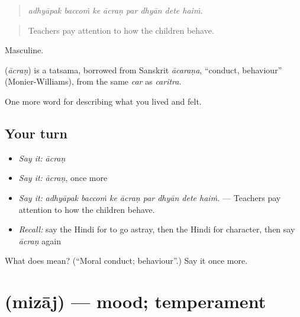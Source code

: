 \begin{quote}
       
\end{quote}

\begin{quote}
\emph{adhyāpak baccoṁ ke ācraṇ par dhyān dete haiṁ.}
\end{quote}

\begin{quote}
Teachers pay attention to how the children behave.
\end{quote}

Masculine.

\begin{cousinweb}
\textbf{} (\emph{ācraṇ}) is a tatsama, borrowed from Sanskrit \emph{ācaraṇa}, \textquotedblleft{}conduct, behaviour\textquotedblright{} (Monier-Williams), from the same \emph{car} as \emph{caritra}.
\end{cousinweb}

\begin{grammarlens}[title={What you've built}]
One more word for describing what you lived and felt.
\end{grammarlens}

\subsection*{Your turn}
\begin{itemize}
\raggedright
  \item \emph{Say it:} \emph{ācraṇ}
  \item \emph{Say it:} \emph{ācraṇ}, once more
  \item \emph{Say it:} \emph{adhyāpak baccoṁ ke ācraṇ par dhyān dete haiṁ.} — Teachers pay attention to how the children behave.
  \item \emph{Recall:} say the Hindi for to go astray, then the Hindi for character, then say \emph{ācraṇ} again
\end{itemize}

\begin{tcolorbox}[breakable,colback=teal!4,colframe=teal!35!black,title={Before you move on}]
What does  mean? (\textquotedblleft{}Moral conduct; behaviour\textquotedblright{}.) Say it once more.
\end{tcolorbox}
\section[\texorpdfstring{\hi{मिज़ाज} (mizāj)}{मिज़ाज (mizāj)}]{ (mizāj) — mood; temperament}

